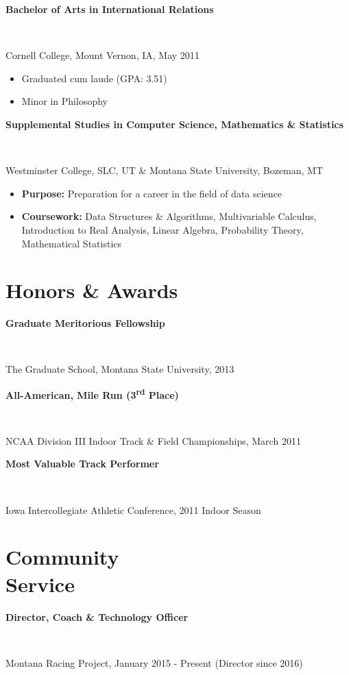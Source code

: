 \documentclass[resmargin, line, pifont ,palatino,courier]{res}
\newcommand{\tab}[1][1cm]{\hspace*{#1}}
\newcommand{\subtext}[1]{\tighter ~ \newline \tab[0.5cm] \parbox{\fullwidth}{#1}}
\newcommand{\fullwidth}{11.5cm}
\newcommand{\tight}{\vspace{-0.5cm}}
\newcommand{\tighter}{\vspace{-0.75cm}}
\begin{document}
\begin{resume}
\textbf{Bachelor of Arts in International Relations}

	\subtext{Cornell College, Mount Vernon, IA, May 2011}
	
	\tight
	
	\begin{itemize}
		\item Graduated cum laude (GPA: 3.51) 
		\item Minor in Philosophy
	\end{itemize}

\textbf{Supplemental Studies in Computer Science, Mathematics \& Statistics}

	\subtext{Westminster College, SLC, UT \& Montana State University, Bozeman, MT}
	
	\tight

	\begin{itemize}
		\item \textbf{Purpose:} Preparation for a career in the field of data science
		\item \textbf{Coursework:} Data Structures \& Algorithms, Multivariable Calculus, Introduction to Real Analysis, Linear Algebra, Probability Theory, Mathematical Statistics
	\end{itemize}

\section{\sc Honors \& Awards}


\textbf{Graduate Meritorious Fellowship} 

	\subtext{The Graduate School, Montana State University, 2013}

\textbf{All-American, Mile Run (3\textsuperscript{rd} Place)}  

	\subtext{NCAA Division III Indoor Track \& Field Championships, March 2011}

\textbf{Most Valuable Track Performer} 

	\subtext{Iowa Intercollegiate Athletic Conference, 2011 Indoor Season}

\section{\sc Community \\Service} 

\textbf{Director, Coach \& Technology Officer}
	
	\subtext{Montana Racing Project, January 2015 - Present (Director since 2016)}
	

\end{resume}
\end{document}
